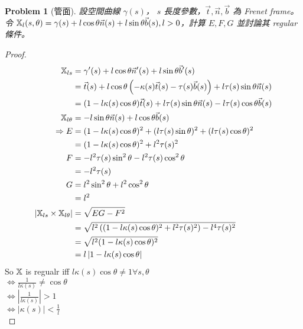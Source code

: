 \documentclass[10pt,a4paper]{article}
\newcounter{theProblemCounter}
\newtheorem{problem}[theProblemCounter]{Problem}
\begin{document}
\setcounter{theProblemCounter}{2}
\begin{problem}[管面]
設空間曲線 $\gamma(s)$， $s$ 長度參數，$\vec{t}, \vec{n}, \vec{b}$ 為 Frenet frame。令 $\mathbb{X}_l(s,\theta)=\gamma(s)+l\cos\theta\vec{n}(s) + l\sin\theta\vec{b}(s), l>0$，計算 $E, F, G$ 並討論其 regular 條件。
\end{problem}
\begin{proof}
\begin{align*}
\mathbb{X}_{ls}&=\gamma'(s)+l\cos\theta\vec{n}'(s) + l\sin\theta\vec{b}'(s)\\
&=\vec{t}(s)+l\cos\theta\left(-\kappa(s)\vec{t}(s)-\tau(s)\vec{b}(s)\right) + l\tau(s)\sin\theta\vec{n}(s)\\
&=(1-l\kappa(s)\cos\theta)\vec{t}(s) + l\tau(s)\sin\theta\vec{n}(s) - l\tau(s)\cos\theta\vec{b}(s)\\
\mathbb{X}_{l\theta}&=-l\sin\theta\vec{n}(s) + l\cos\theta\vec{b}(s)\\
\Rightarrow E&=(1-l\kappa(s)\cos\theta)^2+(l\tau(s)\sin\theta)^2+(l\tau(s)\cos\theta)^2\\
&=(1-l\kappa(s)\cos\theta)^2+l^2\tau(s)^2\\
F&=-l^2\tau(s)\sin^2\theta-l^2\tau(s)\cos^2\theta\\
&=-l^2\tau(s)\\
G&=l^2\sin^2\theta+l^2\cos^2\theta\\
&=l^2\\
\left|\mathbb{X}_{ls}\times\mathbb{X}_{l\theta}\right|&=\sqrt{EG-F^2}\\
&=\sqrt{l^2\left((1-l\kappa(s)\cos\theta)^2+l^2\tau(s)^2\right)-l^4\tau(s)^2}\\
&=\sqrt{l^2(1-l\kappa(s)\cos\theta)^2}\\
&=l\left|1-l\kappa(s)\cos\theta\right|\\
\end{align*}
So $\mathbb{X}$ is regualr iff $l\kappa(s)\cos\theta\neq 1 \forall s,\theta$\\
$\Leftrightarrow \frac{1}{l\kappa(s)}\neq \cos\theta$\\
$\Leftrightarrow \left|\frac{1}{l\kappa(s)}\right|>1$\\
$\Leftrightarrow \left|\kappa(s)\right|<\frac{1}{l}$\\
\end{proof}
\end{document}
